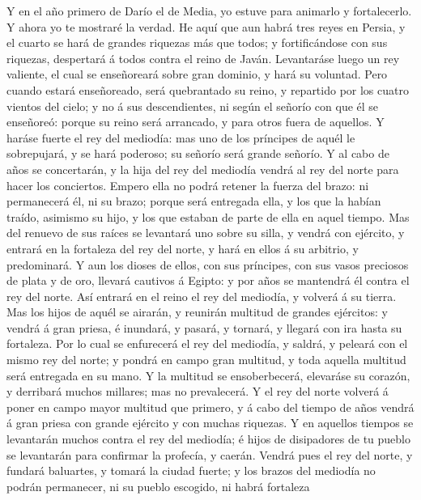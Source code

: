  Y en el año primero de Darío el de Media, yo estuve para
animarlo y fortalecerlo.  Y ahora yo te mostraré la verdad.
He aquí que aun habrá tres reyes en Persia, y el cuarto se hará de
grandes riquezas más que todos; y fortificándose con sus riquezas,
despertará á todos contra el reino de Javán.  Levantaráse
luego un rey valiente, el cual se enseñoreará sobre gran dominio, y hará
su voluntad.  Pero cuando estará enseñoreado, será
quebrantado su reino, y repartido por los cuatro vientos del cielo; y no
á sus descendientes, ni según el señorío con que él se enseñoreó: porque
su reino será arrancado, y para otros fuera de aquellos.  Y
haráse fuerte el rey del mediodía: mas uno de los príncipes de aquél le
sobrepujará, y se hará poderoso; su señorío será grande señorío.
 Y al cabo de años se concertarán, y la hija del rey del
mediodía vendrá al rey del norte para hacer los conciertos. Empero ella
no podrá retener la fuerza del brazo: ni permanecerá él, ni su brazo;
porque será entregada ella, y los que la habían traído, asimismo su
hijo, y los que estaban de parte de ella en aquel tiempo. 
Mas del renuevo de sus raíces se levantará uno sobre su silla, y vendrá
con ejército, y entrará en la fortaleza del rey del norte, y hará en
ellos á su arbitrio, y predominará.  Y aun los dioses de
ellos, con sus príncipes, con sus vasos preciosos de plata y de oro,
llevará cautivos á Egipto: y por años se mantendrá él contra el rey del
norte.  Así entrará en el reino el rey del mediodía, y
volverá á su tierra.  Mas los hijos de aquél se airarán, y
reunirán multitud de grandes ejércitos: y vendrá á gran priesa, é
inundará, y pasará, y tornará, y llegará con ira hasta su fortaleza.
 Por lo cual se enfurecerá el rey del mediodía, y saldrá, y
peleará con el mismo rey del norte; y pondrá en campo gran multitud, y
toda aquella multitud será entregada en su mano.  Y la
multitud se ensoberbecerá, elevaráse su corazón, y derribará muchos
millares; mas no prevalecerá.  Y el rey del norte volverá á
poner en campo mayor multitud que primero, y á cabo del tiempo de años
vendrá á gran priesa con grande ejército y con muchas riquezas.
 Y en aquellos tiempos se levantarán muchos contra el rey
del mediodía; é hijos de disipadores de tu pueblo se levantarán para
confirmar la profecía, y caerán.  Vendrá pues el rey del
norte, y fundará baluartes, y tomará la ciudad fuerte; y los brazos del
mediodía no podrán permanecer, ni su pueblo escogido, ni habrá fortaleza
